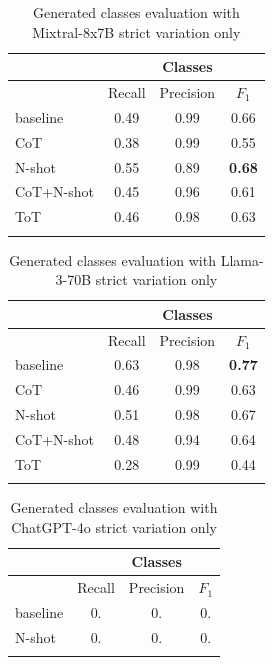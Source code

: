 \begin{table}[!h]
    \scriptsize
    \centering
    \setlength{\tabcolsep}{0.5em}
    \begin{tabular}{lccc}
    \toprule
         & & Classes & \\
     \toprule
         & Recall & Precision & $F_1$ \\
    \toprule
    
    \addlinespace
         baseline    & 0.49 & 0.99 & 0.66 \\
    	 CoT         & 0.38 & 0.99 & 0.55 \\
         N-shot      & 0.55 & 0.89 & \textbf{0.68} \\
         CoT+N-shot  & 0.45 & 0.96 & 0.61 \\
         ToT         & 0.46 & 0.98 & 0.63 \\
    \addlinespace
    \bottomrule
    \addlinespace
    \end{tabular}
    \caption{Generated classes evaluation with Mixtral-8x7B strict variation only}
    \label{tab:mixtral-classes}
\end{table}


\begin{table}[!h]
    \scriptsize
    \centering
    \setlength{\tabcolsep}{0.5em}
    \begin{tabular}{lccc}
    \toprule
    & & Classes & \\
    \toprule
         & Recall & Precision & $F_1$ \\
    \toprule
    
    \addlinespace
         baseline    & 0.63 & 0.98 & \textbf{0.77} \\
    	 CoT         & 0.46 & 0.99 & 0.63 \\
         N-shot      & 0.51 & 0.98 & 0.67 \\
         CoT+N-shot  & 0.48 & 0.94 & 0.64 \\
         ToT         & 0.28 & 0.99 & 0.44 \\
    \addlinespace
    \bottomrule
    \addlinespace
    \end{tabular}
    \caption{Generated classes evaluation with Llama-3-70B strict variation only}
    \label{tab:llama-classes}
\end{table}


\begin{table}[!h]
    \scriptsize
    \centering
    \setlength{\tabcolsep}{0.5em}
    \begin{tabular}{lccc}
    \toprule
    & & Classes & \\
    \toprule
         & Recall & Precision & $F_1$ \\
    \toprule
    
    \addlinespace
         baseline    & 0. & 0. & 0. \\
         N-shot      & 0. & 0. & 0. \\
    \addlinespace
    \bottomrule
    \addlinespace
    \end{tabular}
    \caption{Generated classes evaluation with ChatGPT-4o strict variation only}
    \label{tab:llama-classes}
\end{table}


